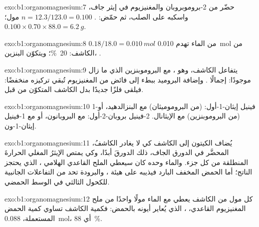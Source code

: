 \begin{solution}{exo:b1:organomagnesium:7}
حضّر  من 2-بروموبروبان والمغنيزيوم في إيثر جاف،
واسكبه على  الصلب، ثم حمّض: . $n = 12.3/123.0 = 0.100$ مول؛
$0.100 \times 0.70 \times 88.0 = \qty{6.2}{g}$.
\end{solution}

\begin{solution}{exo:b1:organomagnesium:8}
$0.18/18.0 = \qty{0.010}{mol}$ من الماء تهدم \qty{0.010}{mol} من
الكاشف: \qty{20}{\percent}؛ ويتكوّن البنزين، .
\end{solution}

\begin{solution}{exo:b1:organomagnesium:9}
يتفاعل الكاشف، وهو ، مع البروموبنزين الذي ما زال موجودًا:
إجمالًا . وإضافة البروميد
ببطء إلى فائض من المغنيزيوم تُبقي تركيزه منخفضًا: فيلقى فلزًا
جديدًا بدل الكاشف المتكوّن من قبل.
\end{solution}

\begin{solution}{exo:b1:organomagnesium:10}
1-فينيل إيثان-1-أول:  (من البروموميثان) مع البنزالدهيد،
أو  (من البروموبنزين) مع الإيثانال. 2-فينيل بروبان-2-أول:
 مع البروبانون، أو  مع
1-فينيل إيثان-1-ون.
\end{solution}

\begin{solution}{exo:b1:organomagnesium:11}
يُضاف الكيتون إلى الكاشف كي لا يغادر الكاشفُ، المحضَّر في
الدورق الجاف، ذلك الدورقَ أبدًا، وكي يمتص الإيثرُ المغلي الحرارةَ المنطلقة من كل جزء.
والماء وحده كان سيعطي الملح القاعدي الهلامي
، الذي يحتجز الناتج؛ أما الحمض المخفف البارد فيذيبه
على هيئة ، والبرودة تحد من التفاعلات الجانبية
للكحول الثالثي في الوسط الحمضي.
\end{solution}

\begin{solution}{exo:b1:organomagnesium:12}
كل مول من الكاشف يعطي مع الماء مولًا واحدًا من ملح المغنيزيوم القاعدي،
، الذي يُعاير أيونه  بالحمض:
فكمية الكاشف تساوي كمية الحمض المستعملة، \qty{0.088}{mol}، أي 
\qty{88}{\percent}.
\end{solution}

